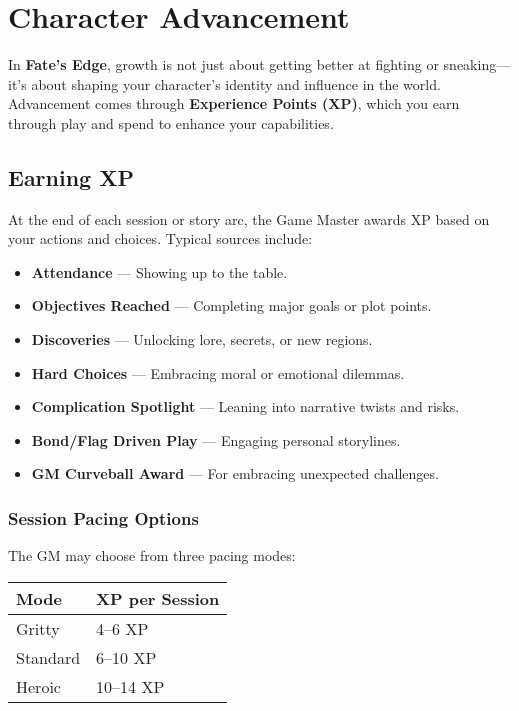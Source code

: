 
\chapter{Character Advancement}

In \textbf{Fate's Edge}, growth is not just about getting better at fighting or sneaking—it's about shaping your character's identity and influence in the world. Advancement comes through \textbf{Experience Points (XP)}, which you earn through play and spend to enhance your capabilities.

\section{Earning XP}

At the end of each session or story arc, the Game Master awards XP based on your actions and choices. Typical sources include:

\begin{itemize}
  \item \textbf{Attendance} — Showing up to the table.
  \item \textbf{Objectives Reached} — Completing major goals or plot points.
  \item \textbf{Discoveries} — Unlocking lore, secrets, or new regions.
  \item \textbf{Hard Choices} — Embracing moral or emotional dilemmas.
  \item \textbf{Complication Spotlight} — Leaning into narrative twists and risks.
  \item \textbf{Bond/Flag Driven Play} — Engaging personal storylines.
  \item \textbf{GM Curveball Award} — For embracing unexpected challenges.
\end{itemize}

\subsection*{Session Pacing Options}

The GM may choose from three pacing modes:

\begin{center}
\begin{tabular}{ll}
\toprule
\textbf{Mode} & \textbf{XP per Session} \\
\midrule
Gritty & 4–6 XP \\
Standard & 6–10 XP \\
Heroic & 10–14 XP \\
\bottomrule
\end{tabular}
\end{center}

